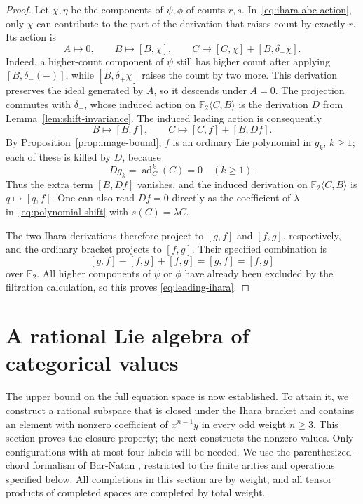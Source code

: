 \documentclass[11pt]{article}
\theoremstyle{definition}
\theoremstyle{remark}
\numberwithin{equation}{section}
\begin{document}
\begin{proof}
Let $\chi,\eta$ be the components of $\psi,\phi$ of counts
$r,s$.  In~\eqref{eq:ihara-abc-action}, only $\chi$ can contribute
to the part of the derivation that raises count by exactly $r$.
Its action is
\[
 A\longmapsto0,\qquad
 B\longmapsto[B,\chi],\qquad
 C\longmapsto[C,\chi]+[B,\delta_-\chi].
\]
Indeed, a higher-count component of $\psi$ still has higher count
after applying $[B,\delta_-(-)]$, while
$[B,\delta_+\chi]$ raises the count by two more.
This derivation preserves the ideal generated by $A$, so it
descends under $A=0$.
The projection commutes with $\delta_-$, whose induced action
on ${\mathbb F_2}\langle C,B\rangle$ is the derivation $D$ from
Lemma~\ref{lem:shift-invariance}.
The induced leading action is consequently
\[
 B\longmapsto[B,f],\qquad
 C\longmapsto[C,f]+[B,Df].
\]
By Proposition~\ref{prop:image-bound}, $f$ is an ordinary Lie
polynomial in $g_k$, $k\geq1$; each of these is killed by $D$,
because
\[
 Dg_k=\operatorname{ad}_C^k(C)=0\quad(k\geq1).
\]
Thus the extra term $[B,Df]$ vanishes, and the induced derivation
on ${\mathbb F_2}\langle C,B\rangle$ is $q\mapsto[q,f]$.
One can also read $Df=0$ directly as the coefficient of $\lambda$
in~\eqref{eq:polynomial-shift} with $s(C)=\lambda C$.

The two Ihara derivations therefore project to $[g,f]$ and
$[f,g]$, respectively, and the ordinary bracket projects to
$[f,g]$.  Their specified combination is
\[
 [g,f]-[f,g]+[f,g]=[g,f]=[f,g]
\]
over ${\mathbb F_2}$.
All higher components of $\psi$ or $\phi$ have already been
excluded by the filtration calculation, so this proves
\eqref{eq:leading-ihara}.
\end{proof}

\section{A rational Lie algebra of categorical values}\label{sec:category}

The upper bound on the full equation space is now established.  To
attain it, we construct a rational subspace that is closed under the
Ihara bracket and contains an element with nonzero coefficient of
$x^{n-1}y$ in every odd weight $n\geq3$.  This section proves the
closure property; the next constructs the nonzero values.
Only configurations with at most four labels will be needed.
We use the parenthesized-chord formalism of Bar-Natan
\cite[Sections~2--3]{BarNatan}, restricted to the finite arities and
operations specified below.
All completions in this section are by weight, and all tensor products of
completed spaces are completed by total weight.
\end{document}
